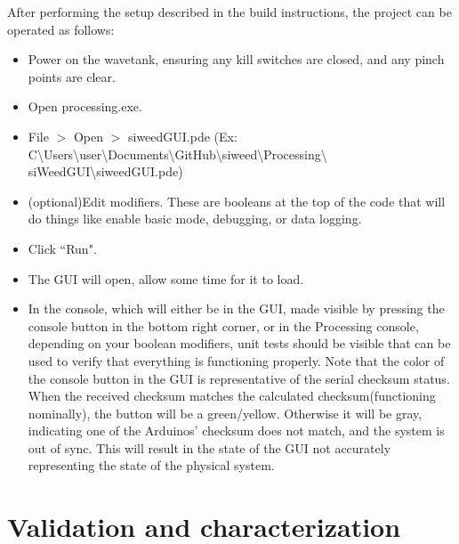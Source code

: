 \documentclass[11pt, letterpaper]{article}
\begin{document}
After performing the setup described in the build instructions, the project can be operated as follows:
\begin{itemize}
\item Power on the wavetank, ensuring any kill switches are closed, and any pinch points are clear.
\item Open processing.exe.
\item File $>$ Open $>$ siweedGUI.pde 
(Ex: C\textbackslash Users\textbackslash user\textbackslash Documents\textbackslash GitHub\textbackslash siweed\textbackslash Processing\textbackslash 
\newline siWeedGUI\textbackslash siweedGUI.pde) 
\item (optional)Edit modifiers. These are booleans at the top of the code that will do things like enable basic mode, debugging, or data logging.
\item Click ``Run".
\item The GUI will open, allow some time for it to load.
\item In the console, which will either be in the GUI, made visible by pressing the console button in the bottom right corner, or in the Processing console, depending on your boolean modifiers, unit tests should be visible that can be used to verify that everything is functioning properly. 
Note that the color of the console button in the GUI is representative of the serial checksum status.
When the received checksum matches the calculated checksum(functioning nominally), the button will be a green/yellow.
Otherwise it will be gray, indicating one of the Arduinos' checksum does not match, and the system is out of sync. 
This will result in the state of the GUI not accurately representing the state of the physical system.
\end{itemize}

\section{Validation and characterization}
\end{document}
